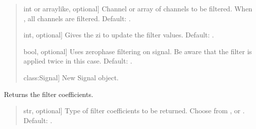 \documentclass[letterpaper,10pt,english]{sphinxmanual}
\begin{document}
\begin{fulllineitems}
\begin{fulllineitems}
\begin{quote}
\begin{description}
\begin{description}
\sphinxlineitem{\sphinxstylestrong{channel}}{[}int or array\sphinxhyphen{}like, optional{]}
\sphinxAtStartPar
Channel or array of channels to be filtered. When , all
channels are filtered. Default: .

\sphinxlineitem{\sphinxstylestrong{activate\_zi}}{[}int, optional{]}
\sphinxAtStartPar
Gives the zi to update the filter values. Default: .

\sphinxlineitem{\sphinxstylestrong{zero\_phase}}{[}bool, optional{]}
\sphinxAtStartPar
Uses zero\sphinxhyphen{}phase filtering on signal. Be aware that the filter
is applied twice in this case. Default: .

\end{description}

\begin{description}
\sphinxlineitem{\sphinxstylestrong{new\_signal}}{[}class:Signal{]}
\sphinxAtStartPar
New Signal object.

\end{description}

\end{description}\end{quote}

\end{fulllineitems}


\begin{fulllineitems}
\label{\detokenize{classes:dsptools.classes.filter_class.Filter.get_coefficients}}
\pysigstartsignatures
{}
\pysigstopsignatures
\sphinxAtStartPar
Returns the filter coefficients.
\begin{quote}\begin{description}
\begin{description}
\sphinxlineitem{\sphinxstylestrong{mode}}{[}str, optional{]}
\sphinxAtStartPar
Type of filter coefficients to be returned. Choose from ,
 or . Default: .

\end{description}


\end{description}
\end{quote}
\end{fulllineitems}
\end{fulllineitems}
\end{document}
